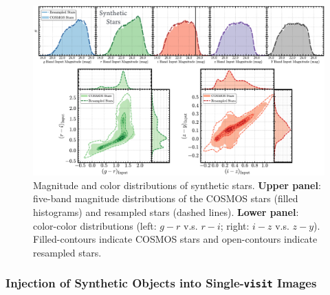 \documentclass[useamsfonts]{pasj01}
\def\visit{\texttt{visit}}
\begin{document}

\begin{figure}
    \begin{center}
        \includegraphics[width=\textwidth]{fig/synpipe_star_sample}
    \end{center}
    \caption{
        Magnitude and color distributions of synthetic stars.
        \textbf{Upper panel}: five-band magnitude distributions of the COSMOS
        stars (filled histograms) and  resampled stars (dashed lines).
        \textbf{Lower panel}: color-color distributions
        (left: $g-r$ v.s. $r-i$; right: $i-z$ v.s. $z-y$). 
        Filled-contours indicate COSMOS stars and open-contours indicate resampled stars.
        }
    \label{fig:star_sample}
\end{figure}


\subsubsection{Injection of Synthetic Objects into Single-\visit{} Images}
    \label{sssec:addFakes}
    
\end{document}

